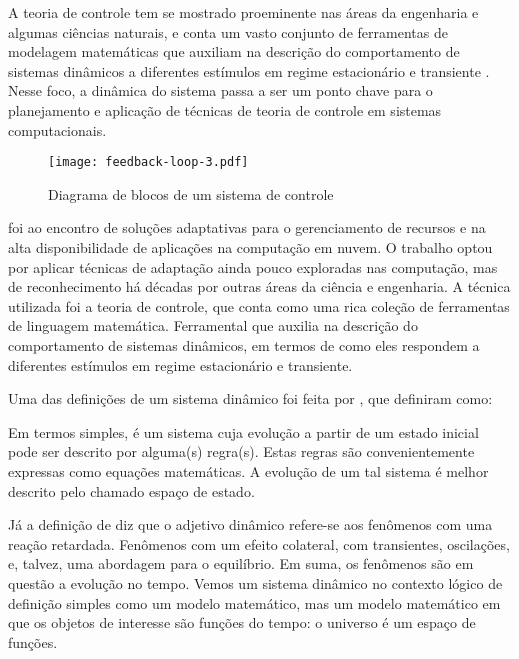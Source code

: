 A teoria de controle tem se mostrado proeminente nas áreas da engenharia e algumas ciências naturais, e conta um vasto conjunto de ferramentas de modelagem matemáticas que auxiliam na descrição do comportamento de sistemas dinâmicos a diferentes estímulos em regime estacionário e transiente \cite{Nobile2013}. Nesse foco, a dinâmica do sistema passa a ser um ponto chave para o planejamento e aplicação de técnicas de teoria de controle em sistemas computacionais. 

\begin{figure}[htb]	
	\centering
	\texttt{[image: feedback-loop-3.pdf]}
	\caption{Diagrama de blocos de um sistema de controle}
	\label{fig:feedback-nobile}	
\end{figure}

 foi ao encontro de soluções adaptativas para o gerenciamento de recursos e na alta disponibilidade de aplicações na computação em nuvem. O trabalho optou por aplicar técnicas de adaptação ainda pouco exploradas nas computação, mas de reconhecimento há décadas por outras áreas da ciência e engenharia. A técnica utilizada foi a teoria de controle, que conta como uma rica coleção de ferramentas de linguagem matemática. Ferramental que auxilia na descrição do comportamento de sistemas dinâmicos, em termos de como eles respondem a diferentes estímulos em regime estacionário e transiente.

Uma das definições de um sistema dinâmico foi feita por , que definiram como:
\begin{citacao}
	Em termos simples, é um sistema cuja evolução a partir de um estado inicial pode ser descrito por alguma(s) regra(s). Estas regras são convenientemente expressas como equações matemáticas. A evolução de um tal sistema é melhor descrito pelo chamado espaço de estado.
\end{citacao}

Já a definição de  diz que o adjetivo dinâmico refere-se aos fenômenos com uma reação retardada. Fenômenos com um efeito colateral, com transientes, oscilações, e, talvez, uma abordagem para o equilíbrio. Em suma, os fenômenos são em questão a evolução no tempo. Vemos um sistema dinâmico no contexto lógico de definição simples como um modelo matemático, mas um modelo matemático em que os objetos de interesse são funções do tempo: o universo é um espaço de funções.

